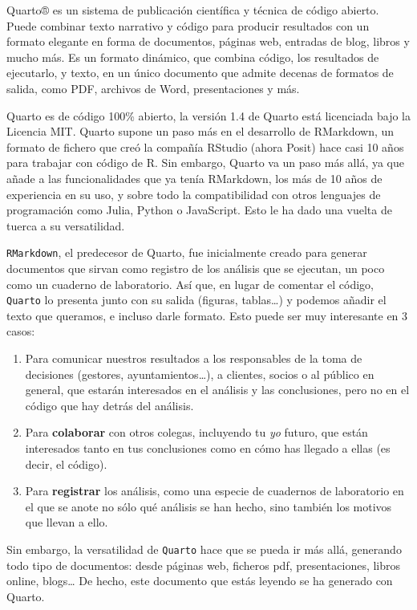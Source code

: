 \documentclass[
  letterpaper,
  DIV=11,
  numbers=noendperiod]{scrreprt}
\begin{document}
Quarto® es un sistema de publicación científica y técnica de código
abierto. Puede combinar texto narrativo y código para producir
resultados con un formato elegante en forma de documentos, páginas web,
entradas de blog, libros y mucho más. Es un formato dinámico, que
combina código, los resultados de ejecutarlo, y texto, en un único
documento que admite decenas de formatos de salida, como PDF, archivos
de Word, presentaciones y más.

Quarto es de código 100\% abierto, la versión 1.4 de Quarto está
licenciada bajo la Licencia MIT. Quarto supone un paso más en el
desarrollo de RMarkdown, un formato de fichero que creó la compañía
RStudio (ahora Posit) hace casi 10 años para trabajar con código de R.
Sin embargo, Quarto va un paso más allá, ya que añade a las
funcionalidades que ya tenía RMarkdown, los más de 10 años de
experiencia en su uso, y sobre todo la compatibilidad con otros
lenguajes de programación como Julia, Python o JavaScript. Esto le ha
dado una vuelta de tuerca a su versatilidad.

\texttt{RMarkdown}, el predecesor de Quarto, fue inicialmente creado
para generar documentos que sirvan como registro de los análisis que se
ejecutan, un poco como un cuaderno de laboratorio. Así que, en lugar de
comentar el código, \texttt{Quarto} lo presenta junto con su salida
(figuras, tablas\ldots) y podemos añadir el texto que queramos, e
incluso darle formato. Esto puede ser muy interesante en 3 casos:

\begin{enumerate}
\def\labelenumi{\arabic{enumi}.}
\item
  Para comunicar nuestros resultados a los responsables de la toma de
  decisiones (gestores, ayuntamientos\ldots), a clientes, socios o al
  público en general, que estarán interesados en el análisis y las
  conclusiones, pero no en el código que hay detrás del análisis.
\item
  Para \textbf{colaborar} con otros colegas, incluyendo tu \emph{yo}
  futuro, que están interesados tanto en tus conclusiones como en cómo
  has llegado a ellas (es decir, el código).
\item
  Para \textbf{registrar} los análisis, como una especie de cuadernos de
  laboratorio en el que se anote no sólo qué análisis se han hecho, sino
  también los motivos que llevan a ello.
\end{enumerate}

Sin embargo, la versatilidad de \texttt{Quarto} hace que se pueda ir más
allá, generando todo tipo de documentos: desde páginas web, ficheros
pdf, presentaciones, libros online, blogs\ldots{} De hecho, este
documento que estás leyendo se ha generado con Quarto.
\end{document}

